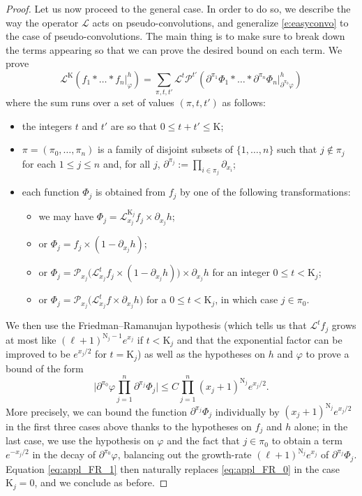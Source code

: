 \documentclass[12pt,twoside]{article}
\theoremstyle{theorem}
\theoremstyle{remark}
\theoremstyle{definition}
\theoremstyle{example}
\newcommand{\1}[1]{\mathds{1}_{#1}}
\newcommand{\cL}{\mathcal{L}}
\newcommand{\cP}{\mathcal{P}}
\newcommand{\rK}{\mathrm{K}}
\newcommand{\rN}{\mathrm{N}}
\begin{document}
\begin{proof}
  Let us now proceed to the general case. In order to do so, we describe the way the operator $\cL$
  acts on pseudo-convolutions, and generalize \eqref{e:easyconvo} to the case of
  pseudo-convolutions.  The main thing is to make sure to break down the terms appearing so that we
  can prove the desired bound on each term. We prove
   \begin{equation}
     \cL^\rK(f_1 \ast \ldots \ast f_n|_\varphi^h)
     = \sum_{\pi, t, t'} 
     \cL^{t}\cP^{t'} (\partial^{\pi_1}\Phi_1 \ast \ldots \ast \partial^{\pi_n} \Phi_n
     |_{\partial^{\pi_0}\varphi}^{h})
   \end{equation}
   where the sum runs over a set of values $(\pi,t,t')$ as follows:
   \begin{itemize}
   \item the integers $t$ and $t'$ are so that $0 \leq t + t' \leq \rK$;
   \item $\pi = (\pi_0, \ldots, \pi_n)$ is a family of disjoint subsets of $\{1, \ldots, n\}$ such
     that $j \notin \pi_j$ for each $1 \leq j \leq n$ and, for all $j$,
     $\partial^{\pi_j} := \prod_{i \in \pi_j} \partial_{x_i}$;
   \item each function $\Phi_j$ is obtained from $f_j$ by one of the following transformations:
     \begin{itemize}
     \item we may have $\Phi_j = \cL_{x_j}^{\rK_j} f_j \times \partial_{x_j} h$;
     \item or $\Phi_j =  f_j \times (1 - \partial_{x_j} h)$;
     \item or $\Phi_j = \cP_{x_j}\big(\cL^t_{x_j} f_j \times (1-\partial_{x_j} h)\big) \times \partial_{x_j} h$ for an
       integer $0 \leq t < \rK_j$;
     \item or $\Phi_j = \cP_{x_j} \big( \cL^t_{x_j} f \times \partial_{x_j} h\big)$ for a
       $0 \leq t < \rK_j$, in which case $j \in \pi_0$.
     \end{itemize}
   \end{itemize}
   We then use the Friedman--Ramanujan hypothesis (which tells us that $\cL^{t}f_j$ grows at most
   like $(\ell+1)^{\rN_j-1} e^{x_j}$ if $t<\rK_j$ and that the exponential factor can be improved to be
   $e^{x_j/2}$ for $t=\rK_j$) as well as the hypotheses on $h$ and $\varphi$ to prove a bound of the
   form
   \begin{equation}
     \label{eq:appl_FR_1}
       \Big|\partial^{\pi_0} \varphi \prod_{j=1}^n \partial^{\pi_j} \Phi_j\Big|
       \leq C \prod_{j=1}^n (x_j+1)^{\rN_j} e^{x_j/2}.
     \end{equation}
     More precisely, we can bound the function $\partial^{\pi_j}\Phi_j$ individually by
     $(x_j+1)^{\rN_j}e^{x_j/2}$ in the first three cases above thanks to the hypotheses on $f_j$ and
     $h$ alone; in the last case, we use the hypothesis on $\varphi$ and the fact that $j \in \pi_0$
     to obtain a term $e^{-x_j/2}$ in the decay of $\partial^{\pi_0}\varphi$, balancing out the
     growth-rate $(\ell+1)^{\rN_j}e^{x_j}$ of $\partial^{\pi_j}\Phi_j$.  Equation
     \eqref{eq:appl_FR_1} then naturally replaces \eqref{eq:appl_FR_0} in the case $\rK_j=0$, and we
     conclude as before.
 \end{proof}
 
\end{document}
